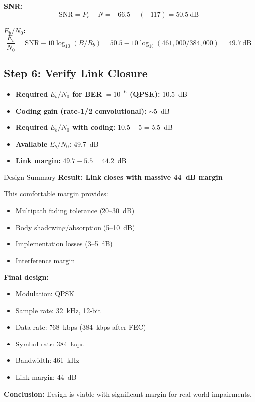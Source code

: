 \textbf{SNR:}
\begin{equation}
\mathrm{SNR} = P_r - N = -66.5 - (-117) = 50.5~\text{dB}
\end{equation}

\textbf{$E_b/N_0$:}
\begin{equation}
\frac{E_b}{N_0} = \mathrm{SNR} - 10\log_{10}(B/R_b) = 50.5 - 10\log_{10}(461{,}000/384{,}000) = 49.7~\text{dB}
\end{equation}

\subsection*{Step 6: Verify Link Closure}

\begin{itemize}
\item \textbf{Required $E_b/N_0$ for BER $= 10^{-6}$ (QPSK):} 10.5~dB
\item \textbf{Coding gain (rate-1/2 convolutional):} $\sim$5~dB
\item \textbf{Required $E_b/N_0$ with coding:} 10.5 -- 5 = 5.5~dB
\item \textbf{Available $E_b/N_0$:} 49.7~dB
\item \textbf{Link margin:} $49.7 - 5.5 = 44.2$~dB
\end{itemize}

\begin{calloutbox}[colback=black!8!white,colframe=black]{Design Summary}
\textbf{Result: Link closes with massive 44~dB margin}

This comfortable margin provides:
\begin{itemize}
\item Multipath fading tolerance (20--30~dB)
\item Body shadowing/absorption (5--10~dB)
\item Implementation losses (3--5~dB)
\item Interference margin
\end{itemize}

\textbf{Final design:}
\begin{itemize}
\item Modulation: QPSK
\item Sample rate: 32~kHz, 12-bit
\item Data rate: 768~kbps (384~kbps after FEC)
\item Symbol rate: 384~ksps
\item Bandwidth: 461~kHz
\item Link margin: 44~dB
\end{itemize}

\textbf{Conclusion:} Design is viable with significant margin for real-world impairments.
\end{calloutbox}

